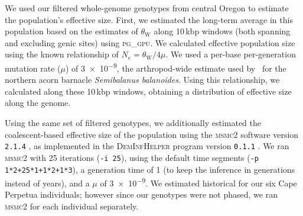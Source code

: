 We used our filtered whole-genome genotypes from central Oregon \bgla{} to estimate the
population's effective size.
First, we estimated the long-term average \Ne{} in this population based on the
estimates of $\theta_\text{W}$ along 10\,kbp windows (both spanning and excluding
genic sites) using \textsc{pg\_gpu}.
We calculated effective population size using the known relationship of
$N_{e} = \theta_\text{W}/4\mu$.
We used a per-base per-generation mutation rate ($\mu$) of \num{3e-9}, the
arthropod-wide estimate used by~\citet{nunez_footprints_2020} for the northern acorn
barnacle \textit{Semibalanus balanoides}.
Using this relationship, we calculated \Ne{} along these 10\,kbp windows, obtaining a
distribution of effective size along the genome.
\vspace{0.1cm}

Using the same set of filtered genotypes, we additionally estimated the coalescent-based
effective size of the population using the \textsc{msmc2} software version \texttt{2.1.4}
\citep{dutheil_msmc_2020}, as implemented in the \textsc{DemInfHelper} program version
\texttt{0.1.1} \citep{forest_popsize_2024}.
We ran \textsc{msmc2} with 25 iterations (\texttt{-i 25}), using the default
time segments (\texttt{-p 1*2+25*1+1*2+1*3}), a generation time of 1 (to keep the inference
in generations instead of years), and a $\mu$ of \num{3e-9}.
We estimated historical \Ne{} for our six Cape Perpetua individuals; however since
our genotypes were not phased, we ran \textsc{msmc2} for each individual separately.
